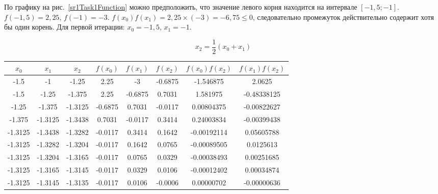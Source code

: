 \documentclass[10pt, a4paper, titlepage]{article}
\begin{document}
По графику на рис.~\ref{sr1Task1Function} можно предположить, что значение левого корня находится на интервале $[-1{,}5;-1]$. $f(-1{,}5)=2{,}25$, $f(-1)=-3$. $f(x_0)f(x_1)=2{,}25\times(-3)=-6{,}75\leq0$, следовательно промежуток действительно содержит хотя бы один корень. Для первой итерации: $x_0=-1{,}5$, $x_1=-1$.

$$x_2=\frac{1}{2}(x_0+x_1)$$

\begin{center}
    \begin{tabular}{|c|c|c|c|c|c|c|c|}
        \hline
        $x_0$ & $x_1$ & $x_2$ & $f(x_0)$ & $f(x_1)$ & $f(x_2)$ & $f(x_0)f(x_2)$ & $f(x_1)f(x_2)$ \\ \hline
        
        -1.5 & -1 & -1.25 &	2.25 &	-3	& -0.6875 & -1.546875 & 2.0625 \\ \hline
        
        -1.5 & -1.25 & -1.375 &	2.25 &	-0.6875	& 0.7031 &	1.581975 &	-0.48338125 \\ \hline
        
        -1.25 &	-1.375 &	-1.3125	& -0.6875 &	0.7031 &	-0.0117 &	0.00804375	& -0.00822627 \\ \hline
        
        -1.375 &	-1.3125 &	-1.3438	& 0.7031 &	-0.0117 &	0.3414 &	0.24003834	& -0.00399438 \\ \hline
        
        -1.3125 &	-1.3438	& -1.3282 &	-0.0117 &	0.3414 &	0.1642	& -0.00192114 &	0.05605788 \\ \hline
        
        -1.3125 &	-1.3282 &	-1.3204	& -0.0117 &	0.1642	& 0.0765 &	-0.00089505	& 0.0125613 \\ \hline
        
        -1.3125 &	-1.3204	& -1.3165 &	-0.0117	& 0.0765	& 0.0329	& -0.00038493 &	0.00251685 \\ \hline
        
        -1.3125 &	-1.3165	& -1.3145 &	-0.0117	& 0.0329 &	0.0106 &	-0.00012402	& 0.00034874 \\ \hline
        
        -1.3125 & -1.3145 & -1.3135 &	-0.0117	& 0.0106 & -0.0006	& 0.00000702 & -0.00000636 \\ \hline
        
    \end{tabular}
\end{center}
\end{document}
